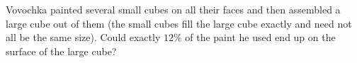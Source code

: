 Vovochka painted several small cubes on all their faces and then assembled a large cube out of them (the small cubes fill the large cube exactly and need not all be the same size). Could exactly \(12\%\) of the paint he used end up on the surface of the large cube?
